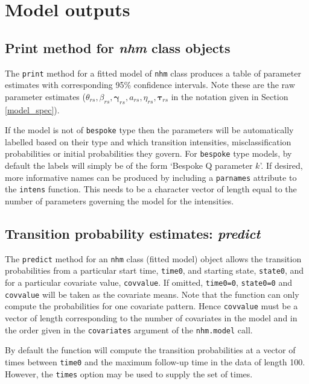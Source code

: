 \documentclass{article}
\numberwithin{equation}{section}
\begin{document}
\section{Model outputs}

\subsection{Print method for {\it nhm} class objects}

The \verb!print! method for a fitted model of \verb!nhm! class produces a table of parameter estimates with corresponding 95\% confidence intervals. Note these are the raw parameter estimates ($\theta_{rs}, \beta_{rs}, \bm\gamma_{rs}, a_{rs}, \eta_{rs}, \bm\tau_{rs}$ in the notation given in Section \ref{model_spec}).

If the model is not of \verb!bespoke! type then the parameters will be automatically labelled based on their type and which transition intensities, misclassification probabilities or initial probabilities they govern. For \verb!bespoke! type models, by default the labels will simply be of the form `Bespoke Q parameter $k$'. If desired, more informative names can be produced by including a \verb!parnames! attribute to the \verb!intens! function. This needs to be a character vector of length equal to the number of parameters governing the model for the intensities.

\subsection{Transition probability estimates: {\it predict}}

The \verb!predict! method for an \verb!nhm! class (fitted model) object allows the transition probabilities from a particular start time, \verb!time0!, and starting state, \verb!state0!, and for a particular covariate value, \verb!covvalue!.
If omitted, \verb!time0=0!, \verb!state0=0! and \verb!covvalue! will be taken as the covariate means.
Note that the function can only compute the probabilities for one covariate pattern. Hence \verb!covvalue! must be a vector of  length corresponding to the number of covariates in the model and in the order given in the \verb!covariates! argument of the \verb!nhm.model! call.

By default the function will compute the transition probabilities at a vector of times between \verb!time0! and the maximum follow-up time in the data of length 100. However, the \verb!times! option may be used to supply the set of times.
\end{document}
